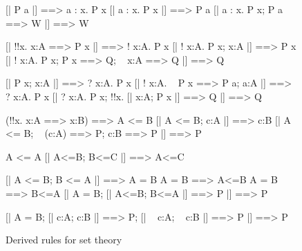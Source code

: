 \begin{figure} \underscoreon
\begin{ttbox}
        [| P a |] ==> a : {\ttlbrace}x. P x{\ttrbrace}
        [| a : {\ttlbrace}x. P x{\ttrbrace} |] ==> P a
        [| a : {\ttlbrace}x. P x{\ttrbrace};  P a ==> W |] ==> W

           [| !!x. x:A ==> P x |] ==> ! x:A. P x
           [| ! x:A. P x;  x:A |] ==> P x
           [| ! x:A. P x;  P x ==> Q;  ~ x:A ==> Q |] ==> Q

            [| P x;  x:A |] ==> ? x:A. P x
           [| ! x:A. ~ P x ==> P a;  a:A |] ==> ? x:A. P x
            [| ? x:A. P x;  !!x. [| x:A; P x |] ==> Q  |] ==> Q

         (!!x. x:A ==> x:B) ==> A <= B
         [| A <= B;  c:A |] ==> c:B
        [| A <= B;  ~ (c:A) ==> P;  c:B ==> P |] ==> P

     A <= A
    [| A<=B;  B<=C |] ==> A<=C

       [| A <= B;  B <= A |] ==> A = B
      A = B ==> A<=B
      A = B ==> B<=A
       [| A = B;  [| A<=B; B<=A |] ==> P |]  ==>  P

      [| A = B;  [| c:A; c:B |] ==> P;  
                           [| ~ c:A; ~ c:B |] ==> P 
                |]  ==>  P
\end{ttbox}
\caption{Derived rules for set theory} \label{hol-set1}
\end{figure}


